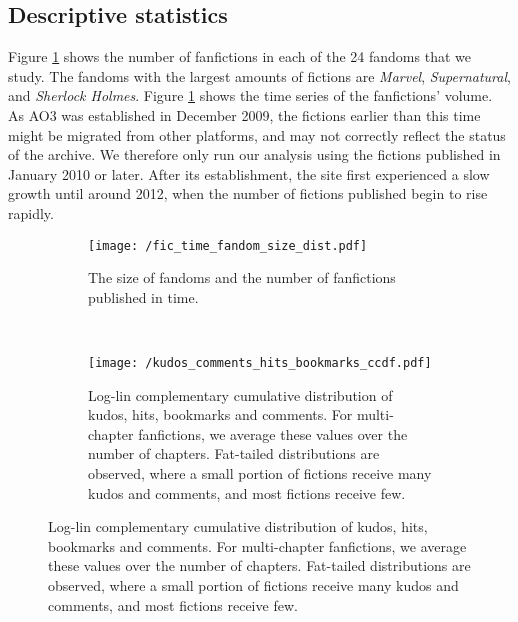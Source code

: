\documentclass[a4paper]{article}
\begin{document}
\subsection*{Descriptive statistics}

Figure \ref{fig:fandom_size} shows the number of fanfictions in each of the 24 fandoms that we study. The fandoms with the largest amounts of fictions are \emph{Marvel}, \emph{Supernatural}, and \emph{Sherlock Holmes}. Figure \ref{fig:fandom_size}  shows the time series of the fanfictions' volume. As AO3 was established in December 2009, the fictions earlier than this time might be migrated from other platforms, and may not correctly reflect the status of the archive. We therefore only run our analysis using the fictions published in January 2010 or later. After its establishment, the site first experienced a slow growth until around 2012, when the number of fictions published begin to rise rapidly. 

\begin{figure}
    \centering
    \begin{subfigure}[b]{\textwidth}
        \texttt{[image: /fic\_time\_fandom\_size\_dist.pdf]}
        \caption{The size of fandoms and the number of fanfictions published in time.}
        \label{fig:fandom_size}
    \end{subfigure}
    ~ %
    \begin{subfigure}[b]{\textwidth}
            \texttt{[image: /kudos\_comments\_hits\_bookmarks\_ccdf.pdf]}
        \caption{Log-lin complementary cumulative distribution of kudos, hits, bookmarks and comments. For multi-chapter fanfictions, we average these values over the number of chapters. Fat-tailed distributions are observed, where a small portion of fictions receive many kudos and comments, and most fictions receive few.}
        \label{fig:kudos_dist}
    \end{subfigure}

\end{figure}
\end{document}
